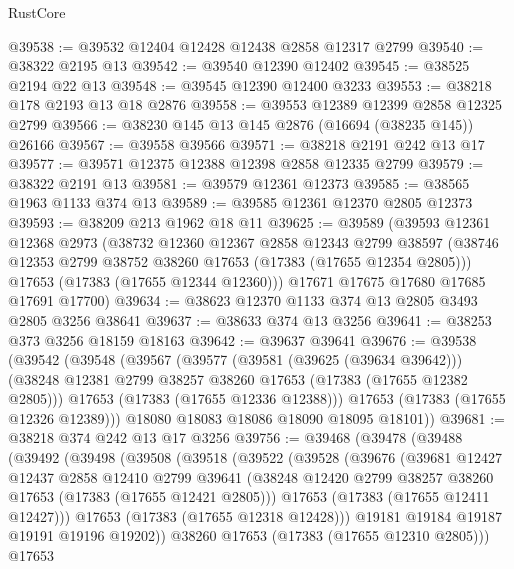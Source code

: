 \begin{lexlean}{RustCore}
\begin{coremodule}
@39538 := @39532 @12404 @12428 @12438 @2858 @12317 @2799
@39540 := @38322 @2195 @13
@39542 := @39540 @12390 @12402
@39545 := @38525 @2194 @22 @13
@39548 := @39545 @12390 @12400 @3233
@39553 := @38218 @178 @2193 @13 @18 @2876
@39558 := @39553 @12389 @12399 @2858 @12325 @2799
@39566 := @38230 @145 @13 @145 @2876 (@16694 (@38235 @145)) @26166
@39567 := @39558 @39566
@39571 := @38218 @2191 @242 @13 @17
@39577 := @39571 @12375 @12388 @12398 @2858 @12335 @2799
@39579 := @38322 @2191 @13
@39581 := @39579 @12361 @12373
@39585 := @38565 @1963 @1133 @374 @13
@39589 := @39585 @12361 @12370 @2805 @12373
@39593 := @38209 @213 @1962 @18 @11
@39625 := @39589
    (@39593
      @12361
      @12368
      @2973
      (@38732
        @12360
        @12367
        @2858
        @12343
        @2799
        @38597
        (@38746 @12353 @2799 @38752 @38260 @17653 (@17383 (@17655 @12354 @2805)))
        @17653
        (@17383 (@17655 @12344 @12360)))
      @17671
      @17675
      @17680
      @17685
      @17691
      @17700)
@39634 := @38623 @12370 @1133 @374 @13 @2805 @3493 @2805 @3256 @38641
@39637 := @38633 @374 @13 @3256
@39641 := @38253 @373 @3256 @18159 @18163
@39642 := @39637 @39641
@39676 := @39538
    (@39542
      (@39548
        (@39567
          (@39577
            (@39581 (@39625 (@39634 @39642)))
            (@38248 @12381 @2799 @38257 @38260 @17653 (@17383 (@17655 @12382 @2805)))
            @17653
            (@17383 (@17655 @12336 @12388)))
          @17653
          (@17383 (@17655 @12326 @12389)))
        @18080
        @18083
        @18086
        @18090
        @18095
        @18101))
@39681 := @38218 @374 @242 @13 @17 @3256
@39756 := @39468
    (@39478
      (@39488
        (@39492
          (@39498
            (@39508
              (@39518
                (@39522
                  (@39528
                    (@39676
                      (@39681
                        @12427
                        @12437
                        @2858
                        @12410
                        @2799
                        @39641
                        (@38248 @12420 @2799 @38257 @38260 @17653 (@17383 (@17655 @12421 @2805)))
                        @17653
                        (@17383 (@17655 @12411 @12427)))
                      @17653
                      (@17383 (@17655 @12318 @12428)))
                    @19181
                    @19184
                    @19187
                    @19191
                    @19196
                    @19202))
                @38260
                @17653
                (@17383 (@17655 @12310 @2805)))
              @17653

\end{coremodule}
\end{lexlean}
